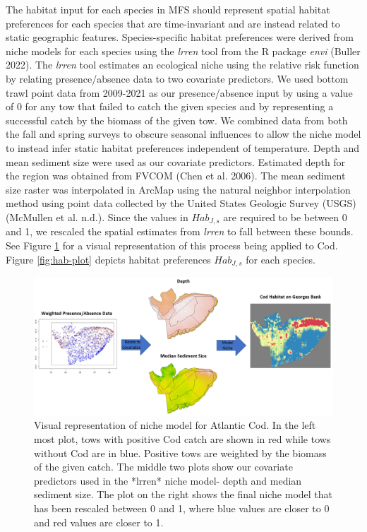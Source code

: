 \documentclass[
  12pt,
]{article}
\begin{document}
The habitat input for each species in MFS should represent spatial habitat preferences for each species that are time-invariant and are instead related to static geographic features. Species-specific habitat preferences were derived from niche models for each species using the \emph{lrren} tool from the R package \emph{envi} (Buller 2022). The \emph{lrren} tool estimates an ecological niche using the relative risk function by relating presence/absence data to two covariate predictors. We used bottom trawl point data from 2009-2021 as our presence/absence input by using a value of 0 for any tow that failed to catch the given species and by representing a successful catch by the biomass of the given tow. We combined data from both the fall and spring surveys to obscure seasonal influences to allow the niche model to instead infer static habitat preferences independent of temperature. Depth and mean sediment size were used as our covariate predictors. Estimated depth for the region was obtained from FVCOM (Chen et al. 2006). The mean sediment size raster was interpolated in ArcMap using the natural neighbor interpolation method using point data collected by the United States Geologic Survey (USGS) (McMullen et al. n.d.). Since the values in \(Hab_{J,s}\) are required to be between 0 and 1, we rescaled the spatial estimates from \emph{lrren} to fall between these bounds. See Figure \ref{fig:hab-plot1} for a visual representation of this process being applied to Cod. Figure \ref{fig:hab-plot} depicts habitat preferences \(Hab_{J,s}\) for each species.

\begin{figure}

{\centering \includegraphics[width=0.95\linewidth]{Images/hab_snip3} 

}

\caption{Visual representation of niche model for Atlantic Cod. In the left most plot, tows with positive Cod catch are shown in red while tows without Cod are in blue. Positive tows are weighted by the biomass of the given catch. The middle two plots show our covariate predictors used in the *lrren* niche model- depth and median sediment size. The plot on the right shows the final niche model that has been rescaled between 0 and 1, where blue values are closer to 0 and red values are closer to 1.}\label{fig:hab-plot1}
\end{figure}
\end{document}
